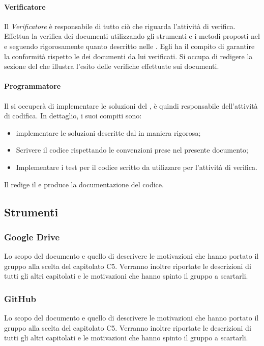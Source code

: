 \paragraph{Verificatore}
Il \textsl{Verificatore} è responsabile di tutto ciò che riguarda l'attività di verifica.
Effettua la verifica dei documenti utilizzando gli strumenti e i metodi proposti nel 
\textsl{\PdQ} e seguendo rigorosamente quanto descritto nelle \textsl{\NdP}.
Egli ha il compito di garantire la conformità rispetto le \textsl{\NdP} dei documenti da lui verificati. 
Si occupa di redigere la sezione del \textsl{\PdQ} che illustra l'esito delle 
verifiche effettuate sui documenti.

\paragraph{Programmatore}
Il \textsl{\Progr} si occuperà di implementare le soluzioni del \textsl{\Prog}, è quindi 
responsabile dell'attività di codifica. In dettaglio, i suoi compiti sono:
\begin{itemize}
  \item implementare le soluzioni descritte dal \textsl{\Prog} in maniera 
  rigorosa;
  \item Scrivere il codice rispettando le convenzioni prese nel presente 
  documento;
  \item Implementare i test per il codice scritto da utilizzare per l'attività 
  di verifica.
\end{itemize}
Il \textsl{\Progr} redige il \textsl{\MU} e produce la documentazione del codice.

\subsection{Strumenti}

\subsubsection{Google Drive}
Lo scopo del documento e quello di descrivere le motivazioni che hanno portato il gruppo alla scelta del capitolato C5.
Verranno inoltre riportate le descrizioni di tutti gli altri capitolati e le motivazioni che hanno spinto il gruppo a scartarli.

\subsubsection{GitHub}
Lo scopo del documento e quello di descrivere le motivazioni che hanno portato il gruppo alla scelta del capitolato C5.
Verranno inoltre riportate le descrizioni di tutti gli altri capitolati e le motivazioni che hanno spinto il gruppo a scartarli.


